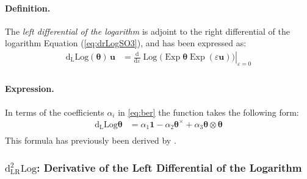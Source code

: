 \paragraph*{Definition.}
The \emph{left differential of the logarithm} is adjoint to the right differential of the logarithm Equation (\ref{eq:drLogSO3}), and has been expressed as:
%
\begin{equation*} 
\begin{aligned}
\operatorname{d_{\scriptscriptstyle{L}}Log} \left({\bm{\theta}} \right)\, \bm{u}
&= \left.\frac{\mathrm{d}}{\mathrm{d}\varepsilon} \operatorname{Log} \bigl(\operatorname{Exp} \bm{\theta}  \operatorname{Exp} (\varepsilon \bm{u})\bigr) \right|_{\varepsilon=0} \\
\end{aligned}
\end{equation*}
 

\paragraph*{Expression.}

In terms of the coefficients \(\alpha_i\) in \eqref{eq:ber}
the function takes the following form:
\begin{equation*} 
\begin{aligned}
\operatorname{d_{\scriptscriptstyle{L}}Log} {\bm{\theta}}
&= \alpha_1 \mathbf{1}
  -\alpha_2 \bm{\theta}^{\times}
  +\alpha_3 \bm{\theta} \otimes \bm{\theta} \\
\end{aligned}
\end{equation*}
This formula has previously been derived by \cite{cardona1988beam}.

\hypertarget{ddLogSO3}{%
  \subsubsection{\texorpdfstring{\(\operatorname{d^2_{\scriptscriptstyle{LR}}Log}\): %
Derivative of the Left Differential of the Logarithm}{%
ddLogSO3: Derivative of the Left Differential of the Logarithm}}\label{sec:ddLogSO3}}
%
